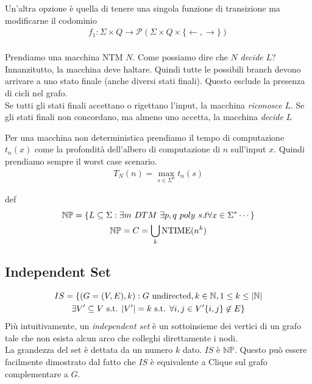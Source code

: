 \documentclass{article}
\begin{document}
Un'altra opzione è quella di tenere una singola funzione di transizione ma modificarne il codominio
\begin{gather*}
    f_1 : \Sigma\times Q \to \mathcal{P}(\Sigma\times Q\times \{\leftarrow,\rightarrow\}) \\
\end{gather*}

Prendiamo una macchina NTM $N$. Come possiamo dire che $N$ \textit{decide} $L$?
Innanzitutto, la macchina deve haltare. Quindi tutte le possibili branch devono arrivare a uno stato finale (anche diversi stati finali). Questo esclude la presenza di cicli nel grafo. \\
Se tutti gli stati finali accettano o rigettano l'input, la macchina \textit{riconosce} $L$.
Se gli stati finali non concordano, ma almeno uno accetta, la macchina \textit{decide} $L$

Per una macchina non deterministica prendiamo il tempo di computazione $t_n(x)$ come la profondità dell'albero di computazione di $n$ sull'input $x$. Quindi prendiamo sempre il worst case scenario.
\begin{gather*}
    T_N(n) = \max_{s\in\Sigma^n}t_n(s)
\end{gather*}

\begin{callout}{def}
    \begin{gather*}
        \mathbb{NP} = \{L\subseteq\Sigma: \exists m\ DTM\ \exists p,q\ poly\ s.t\forall x\in\Sigma^* \cdots \} \\
        \mathbb{NP} = C = \bigcup_k \te{NTIME}(n^k)
    \end{gather*}
\end{callout}

\subsection{Independent Set}
\begin{multline*}
    IS = \{(G=(V,E),k) : G\text{ undirected}, k\in\mathbb N, 1\leq k\leq |\mathbb N| \\
    \exists V'\subseteq V\text{ s.t. } |V'|=k\text{ s.t. } \forall i,j\in V' \{i,j\}\not\in E \}
\end{multline*}
Più intuitivamente, un \textit{independent set} è un sottoinsieme dei vertici di un grafo tale che non esista alcun arco che colleghi direttamente i nodi. \\
La grandezza del set è dettata da un numero $k$ dato.
$IS$ è $\mathbb{NP}$. Questo può essere facilmente dimostrato dal fatto che $IS$ è equivalente a Clique sul grafo complementare a $G$.
\end{document}
